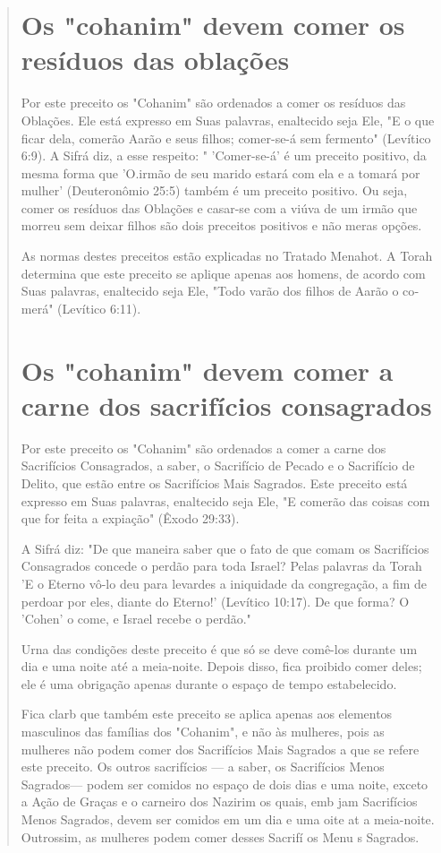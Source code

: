 \begin{quote}
\section{Os "cohanim" devem comer os resíduos das oblações}

Por este preceito os "Cohanim" são ordenados a comer os resíduos das
Oblações. Ele está expresso em Suas palavras, enaltecido seja Ele, "E o
que ficar dela, comerão Aarão e seus filhos; comer-se-á sem fermento"
(Levítico 6:9). A Sifrá diz, a esse respeito: " 'Comer-se-á' é um
preceito positivo, da mesma forma que 'O.irmão de seu
marido estará com ela e a tomará por mulher' (Deu­teronômio 25:5) também
é um preceito positivo. Ou seja, comer os resíduos das Oblações e
casar-se com a viúva de um irmão que morreu sem deixar filhos são dois
preceitos positivos e não meras opções.

As normas destes preceitos estão explicadas no Tratado Menahot. A Torah
determina que este preceito se aplique apenas aos homens, de acordo com
Suas palavras, enaltecido seja Ele, "Todo varão dos filhos de Aarão o
co­merá" (Levítico 6:11).

\section{Os "cohanim" devem comer a carne dos sacrifícios consagrados}

Por este preceito os "Cohanim" são ordenados a comer a carne dos
Sacrifícios Consagrados, a saber, o Sacrifício de Pecado e o Sacrifício
de Delito, que estão entre os Sacrifícios Mais Sagrados. Este preceito
está expresso em Suas palavras, enaltecido seja Ele, "E comerão das
coisas com que for feita a expia­ção" (Êxodo 29:33).

A Sifrá diz: "De que maneira saber que o fato de que comam os
Sa­crifícios Consagrados concede o perdão para toda Israel? Pelas
palavras da To­rah 'E o Eterno vô-lo deu para levardes a iniquidade da
congregação, a fim de perdoar por eles, diante do Eterno!' (Levítico
10:17). De que forma? O 'Cohen' o come, e Israel recebe o perdão."

Urna das condições deste preceito é que só se deve comê-los duran­te um
dia e uma noite até a meia-noite. Depois disso, fica proibido comer
de­les; ele é uma obrigação apenas durante o espaço de tempo
estabelecido.

Fica clarb que também este preceito se aplica apenas aos elementos
masculinos das famílias dos "Cohanim", e não às mulheres, pois as
mulheres não podem comer dos Sacrifícios Mais Sagrados a que se refere
este preceito. Os outros sacrifícios --- a saber, os Sacrifícios Menos
Sagrados--- podem ser co­midos no espaço de dois dias e uma noite,
exceto a Ação de Graças e o carnei­ro dos Nazirim os quais, emb jam
Sacrifícios Menos Sagrados, devem ser comidos em um dia e uma oite at a
meia-noite. Outrossim, as mulheres po­dem comer desses Sacrifí os Menu s
Sagrados.


\end{quote}
